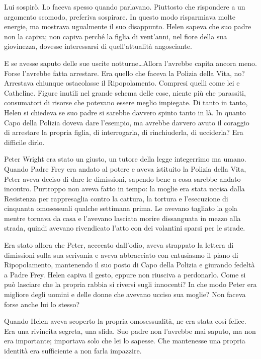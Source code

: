 \documentclass[a4paper,oneside,11pt]{memoir}
\begin{document}
Lui sospirò. Lo faceva spesso quando parlavano. Piuttosto che rispondere a un argomento scomodo,
preferiva sospirare. In questo modo risparmiava molte energie, ma mostrava ugualmente il suo
disappunto. Helen sapeva che suo padre non la capiva; non capiva perché la figlia di vent'anni, nel
fiore della sua giovinezza, dovesse interessarsi di quell'attualità angosciante.

E se avesse saputo delle sue uscite notturne\dots Allora l'avrebbe capita ancora meno. Forse
l'avrebbe fatta arrestare. Era quello che faceva la Polizia della Vita, no? Arrestava chiunque
ostacolasse il Ripopolamento. Compresi quelli come lei e Catheline. Figure inutili nel grande schema
delle cose, niente più che parassiti, consumatori di risorse che potevano essere meglio impiegate.
Di tanto in tanto, Helen si chiedeva se suo padre si sarebbe davvero spinto tanto in là. In quanto
Capo della Polizia doveva dare l'esempio, ma avrebbe davvero avuto il coraggio di arrestare la
propria figlia, di interrogarla, di rinchiuderla, di ucciderla? Era difficile dirlo.

Peter Wright era stato un giusto, un tutore della legge integerrimo ma umano. Quando Padre Frey era
andato al potere e aveva istituito la Polizia della Vita, Peter aveva deciso di dare le dimissioni,
sapendo bene a cosa sarebbe andato incontro. Purtroppo non aveva fatto in tempo: la moglie era stata
uccisa dalla Resistenza per rappresaglia contro la cattura, la tortura e l'esecuzione di cinquanta
omosessuali qualche settimana prima. Le avevano tagliato la gola mentre tornava da casa e l'avevano
lasciata morire dissanguata in mezzo alla strada, quindi avevano rivendicato l'atto con dei
volantini sparsi per le strade.

Era stato allora che Peter, accecato dall'odio, aveva strappato la lettera di dimissioni sulla sua
scrivania e aveva abbracciato con entusiasmo il piano di Ripopolamento, mantenendo il suo posto di
Capo della Polizia e giurando fedeltà a Padre Frey. Helen capiva il gesto, eppure non riusciva a
perdonarlo. Come si può lasciare che la propria rabbia si riversi sugli innocenti? In che modo Peter
era migliore degli uomini e delle donne che avevano ucciso sua moglie? Non faceva forse anche lui lo
stesso?

Quando Helen aveva scoperto la propria omosessualità, ne era stata così felice. Era una rivincita
segreta, una sfida. Suo padre non l'avrebbe mai saputo, ma non era importante; importava solo che
lei lo sapesse. Che mantenesse una propria identità era sufficiente a non farla impazzire.
\end{document}
